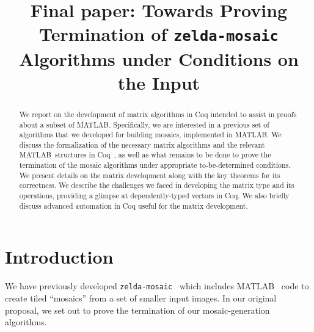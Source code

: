 \documentclass[11pt,conference]{IEEEtran}
\newcommand{\matlab}{MATLAB}
\theoremstyle{plain} %
\theoremstyle{definition}
\theoremstyle{remark}
\begin{document}
\title{Final paper: Towards Proving Termination of \texttt{zelda-mosaic} Algorithms under Conditions on the Input}

\author{
\and
{}
}

\maketitle

\begin{abstract}
    We report on the development of matrix algorithms in Coq intended to assist
    in proofs about a subset of \matlab\@. Specifically, we are interested in a
    previous set of algorithms that we developed for building mosaics,
    implemented in \matlab\@. We discuss the formalization of the necessary
    matrix algorithms and the relevant \matlab\ structures in Coq~\cite{Coq}, as
    well as what remains to be done to prove the termination of the mosaic
    algorithms under appropriate to-be-determined conditions. We present details
    on the matrix development along with the key theorems for its correctness.
    We describe the challenges we faced in developing the matrix type and its
    operations, providing a glimpse at dependently-typed vectors in Coq. We also
    briefly discuss advanced automation in Coq useful for the matrix
    development.
\end{abstract}


\section{Introduction}

We have previously developed \texttt{zelda-mosaic}~\cite{zelda_mosaic} which
includes \matlab~\cite{matlab} code to create tiled ``mosaics'' from a set of
smaller input images. In our original proposal, we set out to prove the
termination of our mosaic-generation algorithms.
\end{document}
